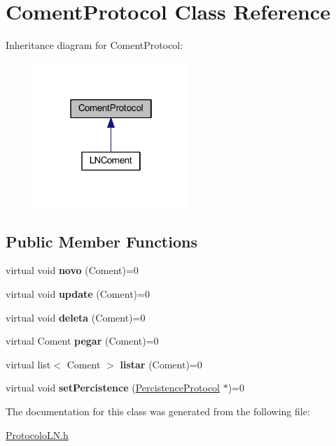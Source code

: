 \hypertarget{class_coment_protocol}{\section{Coment\-Protocol Class Reference}
\label{class_coment_protocol}
}


Inheritance diagram for Coment\-Protocol\-:\nopagebreak
\begin{figure}[H]
\begin{center}
\leavevmode
\includegraphics[width=166pt]{class_coment_protocol__inherit__graph}
\end{center}
\end{figure}
\subsection*{Public Member Functions}
\begin{DoxyCompactItemize}
\item 
\hypertarget{class_coment_protocol_a96c2e0cb9eb4fdbf5a7eae853b6546df}{virtual void {\bfseries novo} (Coment)=0}\label{class_coment_protocol_a96c2e0cb9eb4fdbf5a7eae853b6546df}

\item 
\hypertarget{class_coment_protocol_a5a1cc6af2c1a52b489e6897070e4183a}{virtual void {\bfseries update} (Coment)=0}\label{class_coment_protocol_a5a1cc6af2c1a52b489e6897070e4183a}

\item 
\hypertarget{class_coment_protocol_a466292c4e836394ce7a46a9b86412cae}{virtual void {\bfseries deleta} (Coment)=0}\label{class_coment_protocol_a466292c4e836394ce7a46a9b86412cae}

\item 
\hypertarget{class_coment_protocol_a3a1f008a4638d4d1505b416d7e866158}{virtual Coment {\bfseries pegar} (Coment)=0}\label{class_coment_protocol_a3a1f008a4638d4d1505b416d7e866158}

\item 
\hypertarget{class_coment_protocol_af626d6d87a2586d33d8fdfbab674ea1a}{virtual list$<$ Coment $>$ {\bfseries listar} (Coment)=0}\label{class_coment_protocol_af626d6d87a2586d33d8fdfbab674ea1a}

\item 
\hypertarget{class_coment_protocol_a282b789ce1d561b29a3eb68af1de7296}{virtual void {\bfseries set\-Percistence} (\hyperlink{class_percistence_protocol}{Percistence\-Protocol} $\ast$)=0}\label{class_coment_protocol_a282b789ce1d561b29a3eb68af1de7296}

\end{DoxyCompactItemize}


The documentation for this class was generated from the following file\-:\begin{DoxyCompactItemize}
\item 
\hyperlink{_protocolo_l_n_8h}{Protocolo\-L\-N.\-h}\end{DoxyCompactItemize}

